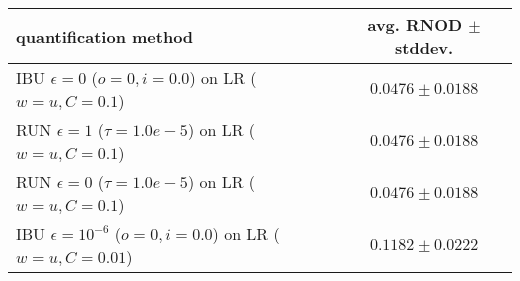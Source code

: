 \begin{tabular}{lc}
  \toprule
  quantification method & avg. RNOD $\pm$ stddev. \\
  \midrule
  IBU $\epsilon=0$ ($o=0, i=0.0$) on LR ($w=u, C=0.1$) & $\mathbf{0.0476 \pm 0.0188}$ \\
  RUN $\epsilon=1$ ($\tau=1.0e-5$) on LR ($w=u, C=0.1$) & $0.0476 \pm 0.0188$ \\
  RUN $\epsilon=0$ ($\tau=1.0e-5$) on LR ($w=u, C=0.1$) & $0.0476 \pm 0.0188$ \\
  IBU $\epsilon=10^{-6}$ ($o=0, i=0.0$) on LR ($w=u, C=0.01$) & $0.1182 \pm 0.0222$ \\
  \bottomrule
\end{tabular}
